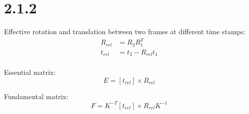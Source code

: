 \documentclass{article}
\begin{document}
\section*{2.1.2}
Effective rotation and translation between two frames at different time stamps:
\begin{align*}
R_{rel} &= R_{2} R_{1}^T \\
t_{rel} &= t_{2} - R_{rel} t_{1} \\
\end{align*}

Essential matrix:
\begin{equation*}
E = [t_{rel}]\times R_{rel}
\end{equation*}

Fundamental matrix:
\begin{equation*}
F = K^{-T} [t_{rel}]\times R_{rel} K^{-1}\end{equation*}
\end{document}
